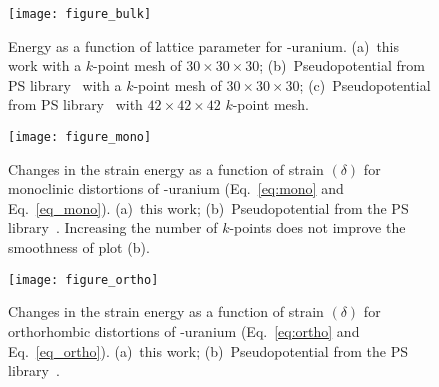 \begin{figure}
	\centering
	\texttt{[image: figure\_bulk]}
    \caption[Energy as a function of lattice parameter for \textgamma-uranium]{Energy as a function of lattice parameter for \textgamma-uranium. (a)~this work with a $k$-point mesh of $30\times30\times30$; (b)~Pseudopotential from PS library~\cite{dal2014pseudopotentials, pp1}
 with a $k$-point mesh of $30\times30\times30$; (c)~Pseudopotential from PS library~\cite{dal2014pseudopotentials, pp1}
 with $42\times42\times42$ $k$-point mesh.}
	\label{fig:bulkgamma}
\end{figure}

\begin{figure}
	\centering
	\texttt{[image: figure\_mono]}
    \caption[Changes in the strain energy as a function of strain $(\delta)$ for monoclinic distortions of \textgamma-uranium]{Changes in the strain energy as a function of strain $(\delta)$ for monoclinic distortions of \textgamma-uranium (Eq.~\eqref{eq:mono} and Eq.~\eqref{eq_mono}). (a)~this work; (b)~Pseudopotential from the PS library~\cite{dal2014pseudopotentials, pp1}. Increasing the number of $k$-points does not improve the smoothness of plot (b).}
\label{fig:monogamma}
\end{figure}

\begin{figure}
	\centering
	\texttt{[image: figure\_ortho]}
    \caption[Changes in the strain energy as a function of strain $(\delta)$ for orthorhombic distortions of \textgamma-uranium]{Changes in the strain energy as a function of strain $(\delta)$ for orthorhombic distortions of \textgamma-uranium (Eq.~\eqref{eq:ortho} and Eq.~\eqref{eq_ortho}). (a)~this work; (b)~Pseudopotential from the PS library~\cite{dal2014pseudopotentials, pp1}.}
	\label{fig:orthogamma}
\end{figure}



\clearpage


%
